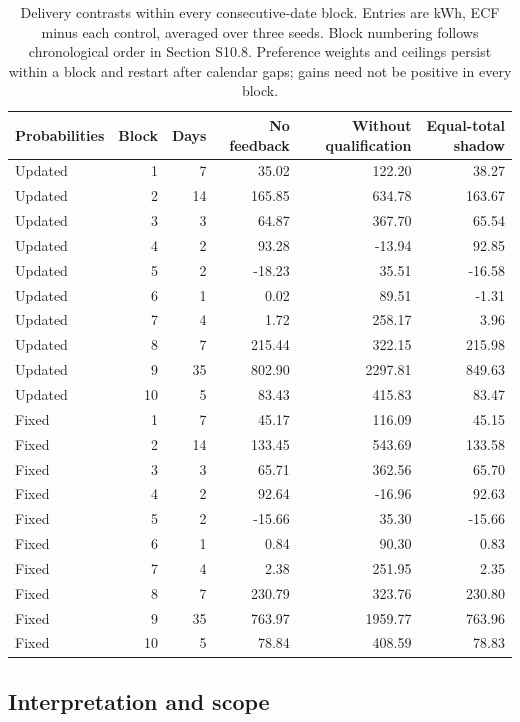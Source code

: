 \documentclass[11pt]{article}
\begin{document}
\begin{table}[!htbp]
\centering
\caption{Delivery contrasts within every consecutive-date block. Entries are kWh, ECF minus each control, averaged over three seeds. Block numbering follows chronological order in Section S10.8. Preference weights and ceilings persist within a block and restart after calendar gaps; gains need not be positive in every block.}
\label{tab:supp_adapt_blocks}
\small
\begin{tabular}{@{}lrrrrr@{}}
\toprule
Probabilities & Block & Days & No feedback & Without qualification & Equal-total shadow \\
\midrule
Updated & 1 & 7 & 35.02 & 122.20 & 38.27 \\
Updated & 2 & 14 & 165.85 & 634.78 & 163.67 \\
Updated & 3 & 3 & 64.87 & 367.70 & 65.54 \\
Updated & 4 & 2 & 93.28 & -13.94 & 92.85 \\
Updated & 5 & 2 & -18.23 & 35.51 & -16.58 \\
Updated & 6 & 1 & 0.02 & 89.51 & -1.31 \\
Updated & 7 & 4 & 1.72 & 258.17 & 3.96 \\
Updated & 8 & 7 & 215.44 & 322.15 & 215.98 \\
Updated & 9 & 35 & 802.90 & 2297.81 & 849.63 \\
Updated & 10 & 5 & 83.43 & 415.83 & 83.47 \\
Fixed & 1 & 7 & 45.17 & 116.09 & 45.15 \\
Fixed & 2 & 14 & 133.45 & 543.69 & 133.58 \\
Fixed & 3 & 3 & 65.71 & 362.56 & 65.70 \\
Fixed & 4 & 2 & 92.64 & -16.96 & 92.63 \\
Fixed & 5 & 2 & -15.66 & 35.30 & -15.66 \\
Fixed & 6 & 1 & 0.84 & 90.30 & 0.83 \\
Fixed & 7 & 4 & 2.38 & 251.95 & 2.35 \\
Fixed & 8 & 7 & 230.79 & 323.76 & 230.80 \\
Fixed & 9 & 35 & 763.97 & 1959.77 & 763.96 \\
Fixed & 10 & 5 & 78.84 & 408.59 & 78.83 \\
\bottomrule
\end{tabular}
\end{table}

\FloatBarrier
\subsection{Interpretation and scope}
\label{supp:au_scope}
\end{document}
